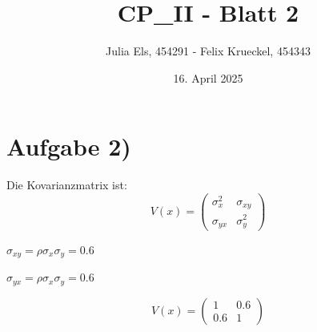 \documentclass{article}
\title{CP\_II - Blatt 2}
\author{Julia Els, 454291 - Felix Krueckel, 454343}
\date{16. April 2025}
\begin{document}
\maketitle

\section*{Aufgabe 2)}


Die Kovarianzmatrix ist:
\[
V(x)=
\begin{pmatrix}
\sigma_{x}^2 & \sigma_{xy}\\
\sigma_{yx}&\sigma_{y}^2
\end{pmatrix}
\]

\vspace{23 pt}
\(\sigma_{xy}=\rho\sigma_{x}\sigma_{y} = 0.6\)
\vspace{23 pt}

\(\sigma_{yx}=\rho\sigma_{x}\sigma_{y} = 0.6 \)
\vspace{23 pt}

\[
V(x)=
\begin{pmatrix}
1 & 0.6\\
0.6&1
\end{pmatrix}
\]
\end{document}
